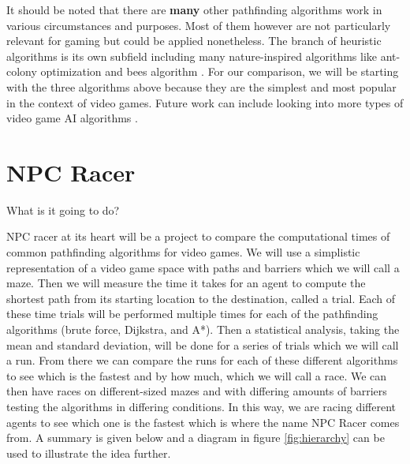 \documentclass[letterpaper,12pt]{article}  %
\begin{document}
It should be noted that there are \textbf{many} other pathfinding algorithms 
\cite{ShortestPathProblem2022 } work in various circumstances and purposes. 
Most of them however are not particularly relevant for gaming but could be 
applied nonetheless. The branch of heuristic algorithms is its own subfield 
including many nature-inspired algorithms like ant-colony optimization 
\cite{AntColonyOptimization2022} and bees algorithm \cite{ BeesAlgorithm2022}. 
For our comparison, we will be starting with the three algorithms above because 
they are the simplest and most popular in the context of video games. Future 
work can include looking into more types of video game AI algorithms 
\cite{millingtonAIGamesThird2019}. 



\section{NPC Racer}
What is it going to do?

NPC racer at its heart will be a project to compare the computational times of 
common pathfinding algorithms for video games. We will use a simplistic 
representation of a video game space with paths and barriers which we will call 
a maze. Then we will measure the time it takes for an agent to compute the 
shortest path from its starting location to the destination, called a trial. 
Each of these time trials will be performed multiple times for each of the 
pathfinding algorithms (brute force, Dijkstra, and A*). Then a statistical 
analysis, taking the mean and standard deviation, will be done for a series of 
trials which we will call a run. From there we can compare the runs for each of 
these different algorithms to see which is the fastest and by how much, which 
we will call a race. We can then have races on different-sized mazes and with 
differing amounts of barriers testing the algorithms in differing conditions. 
In this way, we are racing different agents to see which one is the fastest 
which is where the name NPC Racer comes from. A summary is given below and a 
diagram in figure \ref{fig:hierarchy} can be used to illustrate the idea 
further. 
\end{document}
